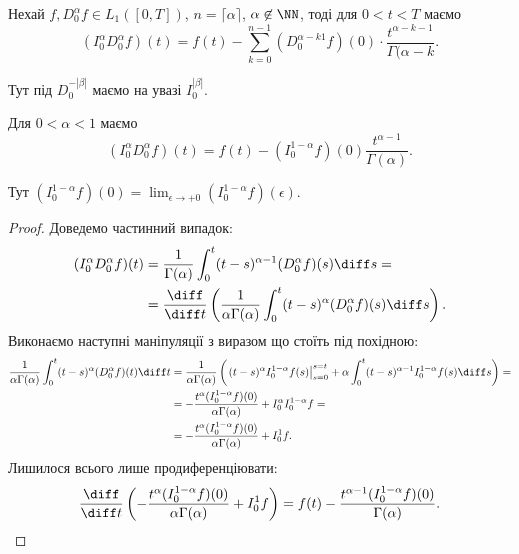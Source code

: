 \begin{proposition}
    Нехай $f, D_0^\alpha f \in L_1([0,T])$, $n = \lceil \alpha \rceil$, $\alpha \not\in \NN$, тоді для $0 < t < T$ маємо
    \begin{equation}
        (I_0^\alpha D_0^\alpha f)(t) = f(t) - \sum_{k = 0}^{n - 1} (D_0^{\alpha - k  1} f)(0) \cdot \frac{t^{\alpha - k - 1}}{\Gamma(\alpha - k}.
    \end{equation}
\end{proposition}
\begin{remark}
    Тут під $D_0^{-|\beta|}$ маємо на увазі $I_0^{|\beta|}$.
\end{remark}
\begin{example}
    Для $0 < \alpha < 1$ маємо
    \begin{equation}
        (I_0^\alpha D_0^\alpha f)(t) = f(t) - (I_0^{1 - \alpha} f)(0) \frac{t^{\alpha - 1}}{\Gamma(\alpha)}.
    \end{equation}
\end{example}
\begin{remark}
    Тут $(I_0^{1 - \alpha} f)(0) = \lim_{\epsilon \to +0} (I_0^{1 - \alpha} f)(\epsilon)$.
\end{remark}
\begin{proof}
    Доведемо частинний випадок:
    \begin{equation}
        \begin{aligned}
            (I_0^\alpha D_0^\alpha f)(t) 
            &= \frac{1}{\Gamma(\alpha)} \int_0^t (t - s)^{\alpha - 1} (D_0^\alpha f) (s) \diff s = \\
            &= \frac{\diff}{\diff t} \left( \frac{1}{\alpha \Gamma(\alpha)} \int_0^t (t - s)^{\alpha} (D_0^\alpha f) (s) \diff s \right).
        \end{aligned}
    \end{equation}
    Виконаємо наступні маніпуляції з виразом що стоїть під похідною:
    \begin{equation}
        \begin{aligned}
            \frac{1}{\alpha \Gamma(\alpha)} \int_0^t (t - s)^{\alpha} (D_0^\alpha f) (t) \diff t
            &= \frac{1}{\alpha \Gamma(\alpha)} \left( \left. (t - s)^{\alpha} I_0^{1-\alpha} f (s) \right|_{s = 0}^{s = t} + \alpha \int_0^t (t - s)^{\alpha - 1} I_0^{1-\alpha} f(s) \diff s \right) = \\
            &= - \frac{t^\alpha (I_0^{1 - \alpha} f)(0)}{\alpha \Gamma(\alpha)} + I_0^\alpha I_0^{1-\alpha} f = \\
            &= - \frac{t^\alpha (I_0^{1 - \alpha} f)(0)}{\alpha \Gamma(\alpha)} + I_0^1 f.
        \end{aligned}
    \end{equation}
    Лишилося всього лише продиференціювати:
    \begin{equation}
        \frac{\diff}{\diff t} \left( - \frac{t^\alpha (I_0^{1 - \alpha} f)(0)}{\alpha \Gamma(\alpha)} + I_0^1 f \right) = f(t) - \frac{t^{\alpha - 1} (I_0^{1-\alpha} f)(0)}{\Gamma(\alpha)}.
    \end{equation}
\end{proof}

